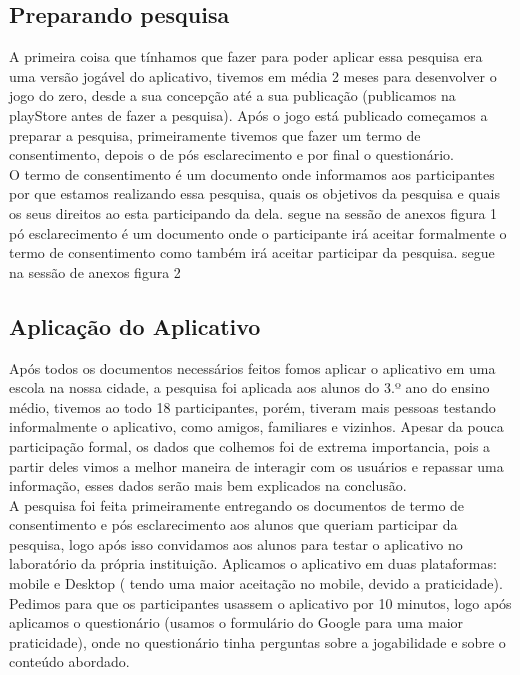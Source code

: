 \documentclass[12pt]{article}
\begin{document}
	\subsection{Preparando pesquisa} %
		A primeira coisa que tínhamos que fazer para poder aplicar essa pesquisa era uma versão jogável do aplicativo, tivemos em média 2 meses para desenvolver o jogo do zero, desde a sua concepção até a sua publicação (publicamos na playStore antes de fazer a pesquisa). Após o jogo está publicado começamos a preparar a pesquisa, primeiramente tivemos que fazer um termo de consentimento, depois o de pós esclarecimento e por final o questionário.\\
		
		O termo de consentimento é um documento onde informamos aos participantes por que estamos realizando essa pesquisa, quais os objetivos da pesquisa e quais os seus direitos ao esta participando da dela. segue na sessão de anexos figura 1 \\
		
		pó esclarecimento é um documento onde o participante irá aceitar formalmente o termo de consentimento como também irá aceitar participar da pesquisa. segue na sessão de anexos figura 2 \\
		
	
	\subsection{Aplicação do Aplicativo}%
		Após todos os documentos necessários feitos fomos aplicar o aplicativo em uma escola na nossa cidade, a pesquisa foi aplicada aos alunos do 3.º ano do ensino médio, tivemos ao todo 18 participantes, porém, tiveram mais pessoas testando informalmente o aplicativo, como amigos, familiares e vizinhos. Apesar da pouca participação formal, os dados que colhemos foi de extrema importancia, pois a partir deles vimos a melhor maneira de interagir com os usuários e repassar uma informação, esses dados serão mais bem explicados na conclusão.\\
		
		
		A pesquisa foi feita primeiramente entregando os documentos de termo de consentimento e pós esclarecimento aos alunos que queriam participar da pesquisa, logo após isso convidamos aos alunos para testar o aplicativo no laboratório da própria instituição. Aplicamos o aplicativo em duas plataformas: mobile e Desktop ( tendo uma maior aceitação no mobile, devido a praticidade). Pedimos para que os participantes usassem o aplicativo por 10 minutos, logo após aplicamos o questionário (usamos o formulário do Google para uma maior praticidade), onde no questionário tinha perguntas sobre a jogabilidade e sobre o conteúdo abordado.\\
		
\end{document}
